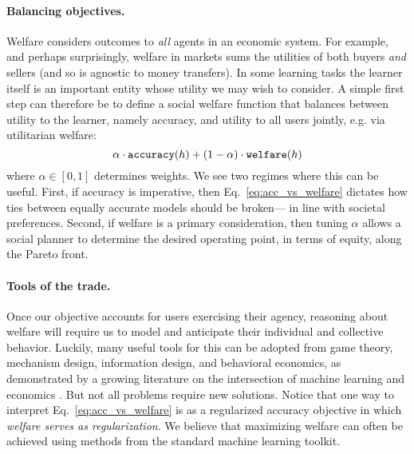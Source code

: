{\paragraph{Balancing objectives.}
Welfare considers outcomes to \emph{all} agents in an economic system.
For example, and perhaps surprisingly,
welfare in markets sums the utilities of both buyers \emph{and} sellers
(and so is agnostic to money transfers).
In some learning tasks the learner itself is an important entity whose utility we may wish to consider.
A simple first step can therefore be to define a social welfare function that balances between utility to the learner, namely accuracy,
and utility to all users jointly, e.g. via utilitarian welfare:
\begin{equation}
\label{eq:acc_vs_welfare}
\alpha \cdot {\mathtt{accuracy}}(h) + (1-\alpha) \cdot {\mathtt{welfare}}(h)
\end{equation}
where $\alpha \in [0,1]$ determines weights.
We see two 
regimes where this can be useful.
First,
if accuracy is imperative,
then Eq.~\eqref{eq:acc_vs_welfare} dictates how ties between equally accurate models
should be broken---%
in line with societal preferences.
Second,
if welfare is a primary consideration,
then tuning $\alpha$ allows a social planner to determine the desired operating point, in terms of equity, along the Pareto front.



\paragraph{Tools of the trade.}
Once our objective accounts for users exercising their agency,
reasoning about welfare will require us to model and anticipate their individual and collective behavior.
Luckily,
many useful tools for this can be adopted from game theory, mechanism design, information design, and behavioral economics,
as demonstrated by a growing literature on the intersection of machine learning and economics \tocite.
But not all problems require new solutions.
Notice that one way to interpret 
Eq.~\eqref{eq:acc_vs_welfare}
is as a regularized accuracy objective in which
\emph{welfare serves as regularization}.
We believe that maximizing welfare can often be achieved 
using methods from the standard machine learning toolkit.

}
